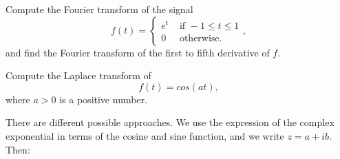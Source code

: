 \documentclass[11pt]{article}
\begin{document}

\begin{exercise}
    
\end{exercise}
\begin{solution}     
\end{solution}

\begin{exercise}
\end{exercise}
\begin{solution}     
\end{solution}

\begin{exercise}
    Compute the Fourier transform of the signal 
    \[
        f(t) = \left\{\begin{array}{ll} e^{t} & \text{ if } -1 \leq t \leq 1 \\ 0 & \text{ otherwise. } \end{array}\right.,
    \]
    and find the Fourier transform of the first to fifth derivative of $f$. 
\end{exercise}
\begin{solution}     
\end{solution}

\begin{exercise}
    Compute the Laplace transform of 
    \[
        f(t) = cos( a t ),
    \]
    where $a > 0$ is a positive number. 
\end{exercise}
\begin{solution}     
    There are different possible approaches. We use the expression of the complex exponential in terms of the cosine and sine function, and we write $z = a + ib$. Then:
\end{solution}
\end{document}
